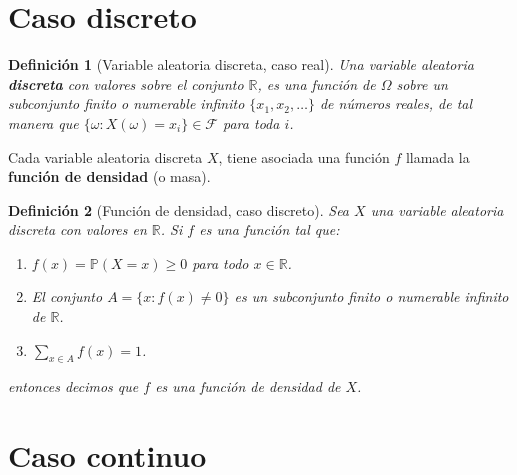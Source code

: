 \documentclass[11pt]{report}
\theoremstyle{break}
\newtheorem{definicion}{Definición}[chapter]
\theoremstyle{break}
\begin{document}
\section{Caso discreto}
\label{seccion:variables discretas}
\begin{definicion}[Variable aleatoria discreta, caso real]
Una variable aleatoria \textbf{discreta} con valores sobre el conjunto $\mathbb{R}$, es una función de $\Omega$ sobre un subconjunto finito o numerable infinito $\{x_1, x_2, \ldots\}$ de números reales, de tal manera que $\{\omega: X(\omega) = x_i \} \in \mathcal{F}$ para toda $i$.
\end{definicion}

Cada variable aleatoria discreta $X$, tiene asociada una función $f$ llamada la \textbf{función de densidad} (o masa).

\begin{definicion}[Función de densidad, caso discreto]
Sea $X$ una variable aleatoria discreta con valores en $\mathbb{R}$. Si $f$ es una función tal que:
\begin{enumerate}[label=\alph*)]
\item $f(x) = \mathbb{P}(X = x) \geq 0$ para todo $x \in \mathbb{R}$.
\item El conjunto $A = \{x: f(x) \neq 0 \}$ es un subconjunto finito o numerable infinito de $\mathbb{R}$.
\item $\sum_{x \in A} f(x) = 1$.
\end{enumerate}
entonces decimos que $f$ es una función de densidad de $X$.
\end{definicion}

\section{Caso continuo}
\label{seccion:variables continuas}
\end{document}
